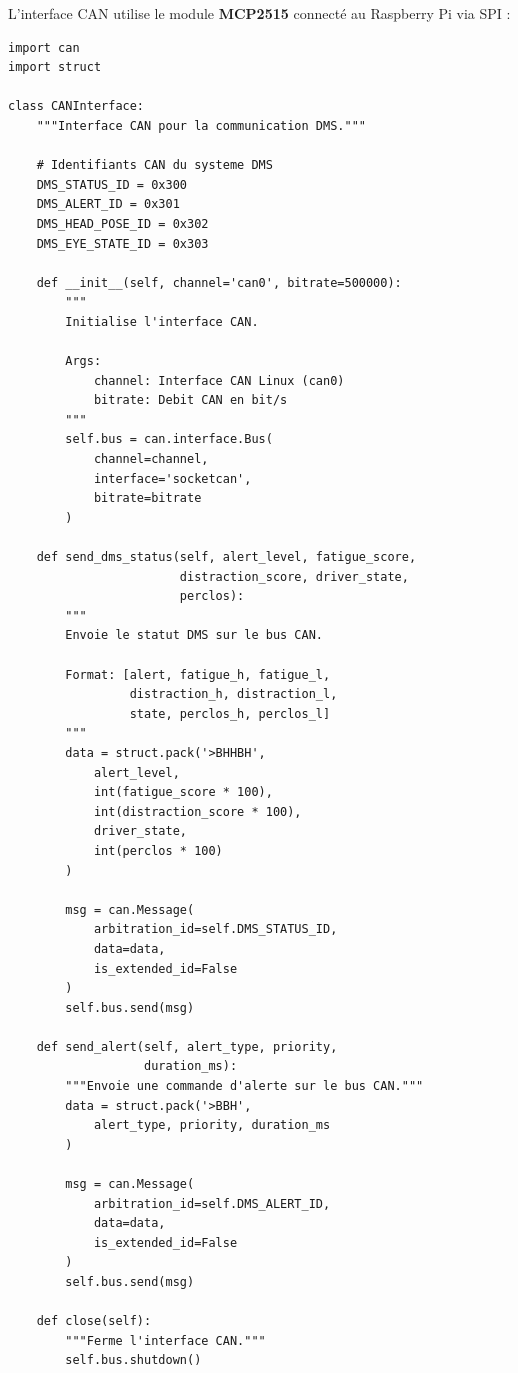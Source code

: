 L'interface CAN utilise le module \textbf{MCP2515} connecté au Raspberry Pi via SPI :

\begin{lstlisting}[style=pythonstyle, caption={Interface CAN pour le prototype robot.}, label={lst:can_interface}]
import can
import struct

class CANInterface:
    """Interface CAN pour la communication DMS."""
    
    # Identifiants CAN du systeme DMS
    DMS_STATUS_ID = 0x300
    DMS_ALERT_ID = 0x301
    DMS_HEAD_POSE_ID = 0x302
    DMS_EYE_STATE_ID = 0x303
    
    def __init__(self, channel='can0', bitrate=500000):
        """
        Initialise l'interface CAN.
        
        Args:
            channel: Interface CAN Linux (can0)
            bitrate: Debit CAN en bit/s
        """
        self.bus = can.interface.Bus(
            channel=channel,
            interface='socketcan',
            bitrate=bitrate
        )
    
    def send_dms_status(self, alert_level, fatigue_score,
                        distraction_score, driver_state,
                        perclos):
        """
        Envoie le statut DMS sur le bus CAN.
        
        Format: [alert, fatigue_h, fatigue_l, 
                 distraction_h, distraction_l,
                 state, perclos_h, perclos_l]
        """
        data = struct.pack('>BHHBH',
            alert_level,
            int(fatigue_score * 100),
            int(distraction_score * 100),
            driver_state,
            int(perclos * 100)
        )
        
        msg = can.Message(
            arbitration_id=self.DMS_STATUS_ID,
            data=data,
            is_extended_id=False
        )
        self.bus.send(msg)
    
    def send_alert(self, alert_type, priority, 
                   duration_ms):
        """Envoie une commande d'alerte sur le bus CAN."""
        data = struct.pack('>BBH',
            alert_type, priority, duration_ms
        )
        
        msg = can.Message(
            arbitration_id=self.DMS_ALERT_ID,
            data=data,
            is_extended_id=False
        )
        self.bus.send(msg)
    
    def close(self):
        """Ferme l'interface CAN."""
        self.bus.shutdown()
\end{lstlisting}

